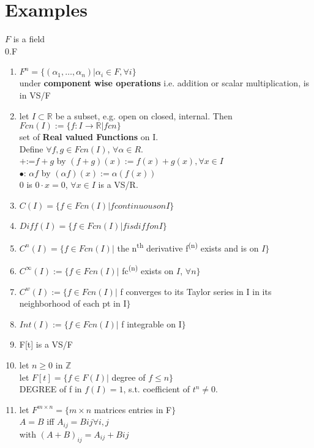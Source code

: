 \documentclass[11pt]{article}
\begin{document}
\section{Examples}
$F$ is a field\\
0.F \\%
\begin{enumerate}
	\item $F^n = \{(\alpha_1,\ldots,\alpha_n)|\alpha_i\in F, \forall i\}$\\under \textbf{component wise operations} i.e. addition or scalar multiplication, is in VS/F
	\item let $I\subset \mathbb{R}$ be a subset, e.g. open on closed, internal. Then\\
	$Fcn(I):=\{f:I\rightarrow\mathbb{R}|fcn\}$\\
	set of \textbf{Real valued Functions} on I.\\ 
	Define $\forall f, g\in Fcn(I)$, $\forall\alpha\in R$.\\
	$+$:=$f+g$ by $(f+g)(x):=f(x)+g(x), \forall x\in I$\\
	$\bullet$: $\alpha f$ by $(\alpha f)(x):=\alpha(f(x))$\\
	0 is $0\cdot x=0$, $\forall x\in I$ is a VS/R.
	\item $C(I)=\{f\in Fcn(I)|f continuous on I\}$
	\item $Diff(I)=\{f\in Fcn(I)|f is diff on I\}$
	\item $C^n(I)=\{f\in Fcn(I)|$ the n\textsuperscript{th} derivative f\textsuperscript{(n)} exists and is on $I\}$
	\item $C^\infty(I):=\{f\in Fcn(I)|$ {fc}\textsuperscript{(n)} exists on $I$, $\forall n\}$
	\item $C^w(I):=\{f\in Fcn(I)|$ f converges to its Taylor series in I in its neighborhood of each pt in I$\}$
	\item $Int(I):=\{f\in Fcn(I)|$ f integrable on I$\}$
	\item F[t] is a VS/F
	\item let $n\geq 0$ in $\mathbb{Z}$\\
	let $F[t]=\{f\in F(I)|$ degree of $f\leq n\}$\\
	DEGREE of f in $f(I)=1$, s.t. coefficient of $t^n\neq 0$. %
	\item let $F^{m\times n}=\{m\times n$ matrices entries in F$\}$\\
	$A=B$ iff $A_{ij}=B{ij} \forall i,j$\\
	with $(A+B)_{ij}=A_{ij}+B{ij}$\\

\end{enumerate}
\end{document}
